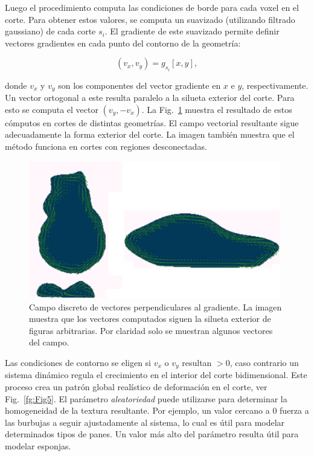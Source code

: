 Luego el procedimiento computa las condiciones de borde para cada voxel en el corte.
Para obtener estos valores, se computa un suavizado (utilizando filtrado gaussiano) de cada corte $s_{i}$.
El gradiente de este suavizado permite definir vectores gradientes en cada punto del contorno de la geometría:

$$\displaystyle (v_{x},v_{y}) = g_{s_{i}}[x,y],$$

\noindent donde $v_{x}$ y $v_{y}$ son los componentes del vector gradiente en $x$ e $y$, respectivamente.
Un vector ortogonal a este resulta paralelo a la silueta exterior del corte.
Para esto se computa el vector $(v_{y},-v_{x})$.
La Fig.~\ref{fg:Fig4} muestra el resultado de estos cómputos en cortes de distintas geometrías.
El campo vectorial resultante sigue adecuadamente la forma exterior del corte.
La imagen también muestra que el método funciona en cortes con regiones desconectadas.


\begin{figure}
  \centerline{\includegraphics[width=11cm]{figures/Fig4}}
  \caption[Campo discreto de vectores perpendiculares al gradiente]{Campo discreto de vectores perpendiculares al gradiente. La imagen muestra que los vectores computados siguen la silueta exterior de figuras arbitrarias. Por claridad solo se muestran algunos vectores del campo.}
  \label{fg:Fig4}
\end{figure}

Las condiciones de contorno se eligen si $v_{x}$ o $v_{y}$ resultan $>0$, caso contrario un sistema dinámico regula el crecimiento en el interior del corte bidimensional.
Este proceso crea un patrón global realístico de deformación en el corte, ver Fig.~\ref{fg:Fig5}.
El parámetro {\em aleatoriedad} puede utilizarse para determinar la homogeneidad de la textura resultante.
Por ejemplo, un valor cercano a 0 fuerza a las burbujas a seguir ajustadamente al sistema, lo cual es útil para modelar determinados tipos de panes.
Un valor más alto del parámetro resulta útil para modelar esponjas.

